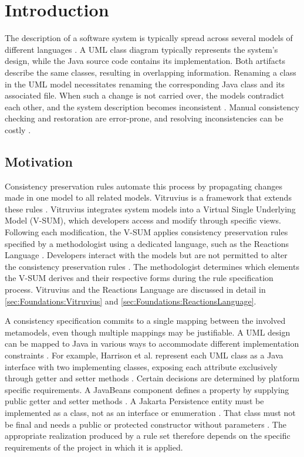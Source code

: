 \chapter{Introduction}
\label{ch:Introduction}

The description of a software system is typically spread across several models of different languages \cite{KLARE2021110815}.
A UML class diagram typically represents the system's design, while the Java source code contains its implementation.
Both artifacts describe the same classes, resulting in overlapping information.
Renaming a class in the UML model necessitates renaming the corresponding Java class and its associated file.
When such a change is not carried over, the models contradict each other, and the system description becomes inconsistent \cite{KLARE2021110815}.
Manual consistency checking and restoration are error-prone, and resolving inconsistencies can be costly \cite{KLARE2021110815}.

\section{Motivation}
\label{sec:Introduction:Motivation}

Consistency preservation rules automate this process by propagating changes made in one model to all related models.
Vitruvius is a framework that extends these rules \cite{KLARE2021110815}.
Vitruvius integrates system models into a Virtual Single Underlying Model (V-SUM), which developers access and modify through specific views.
Following each modification, the V-SUM applies consistency preservation rules specified by a methodologist using a dedicated language, such as the Reactions Language \cite{KLARE2021110815}.
Developers interact with the models but are not permitted to alter the consistency preservation rules \cite{KLARE2021110815}.
The methodologist determines which elements the V-SUM derives and their respective forms during the rule specification process.
Vitruvius and the Reactions Language are discussed in detail in \autoref{sec:Foundations:Vitruvius} and \autoref{sec:Foundations:ReactionsLanguage}.

A consistency specification commits to a single mapping between the involved metamodels, even though multiple mappings may be justifiable.
A UML design can be mapped to Java in various ways to accommodate different implementation constraints \cite{harrison2000mapping}.
For example, Harrison et al. represent each UML class as a Java interface with two implementing classes, exposing each attribute exclusively through getter and setter methods \cite{harrison2000mapping}.
Certain decisions are determined by platform specific requirements.
A JavaBeans component defines a property by supplying public getter and setter methods \cite{javaBeansTutorial}.
A Jakarta Persistence entity must be implemented as a class, not as an interface or enumeration \cite{jakartaPersistence}.
That class must not be final and needs a public or protected constructor without parameters \cite{jakartaPersistence}.
The appropriate realization produced by a rule set therefore depends on the specific requirements of the project in which it is applied.

